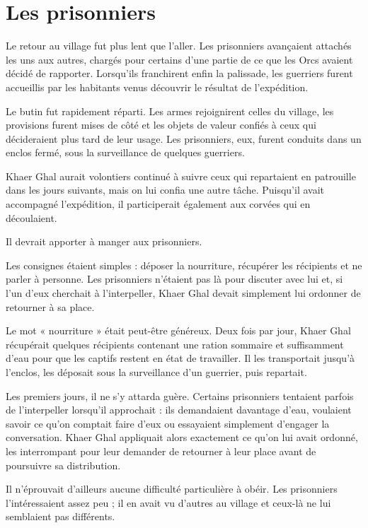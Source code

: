 \chapter{Les prisonniers}
\label{chap:les-prisonniers}

Le retour au village fut plus lent que l'aller. Les prisonniers avançaient
attachés les uns aux autres, chargés pour certains d'une partie de ce que les
Orcs avaient décidé de rapporter. Lorsqu'ils franchirent enfin la palissade,
les guerriers furent accueillis par les habitants venus découvrir le résultat
de l'expédition.

Le butin fut rapidement réparti. Les armes rejoignirent celles du village, les
provisions furent mises de côté et les objets de valeur confiés à ceux qui
décideraient plus tard de leur usage. Les prisonniers, eux, furent conduits
dans un enclos fermé, sous la surveillance de quelques guerriers.

Khaer Ghal aurait volontiers continué à suivre ceux qui repartaient en
patrouille dans les jours suivants, mais on lui confia une autre tâche.
Puisqu'il avait accompagné l'expédition, il participerait également aux corvées
qui en découlaient.

Il devrait apporter à manger aux prisonniers.

Les consignes étaient simples : déposer la nourriture, récupérer les récipients
et ne parler à personne. Les prisonniers n'étaient pas là pour discuter avec
lui et, si l'un d'eux cherchait à l'interpeller, Khaer Ghal devait simplement
lui ordonner de retourner à sa place.

Le mot « nourriture » était peut-être généreux. Deux fois par jour, Khaer Ghal
récupérait quelques récipients contenant une ration sommaire et suffisamment
d'eau pour que les captifs restent en état de travailler. Il les transportait
jusqu'à l'enclos, les déposait sous la surveillance d'un guerrier, puis
repartait.

Les premiers jours, il ne s'y attarda guère. Certains prisonniers tentaient
parfois de l'interpeller lorsqu'il approchait : ils demandaient davantage
d'eau, voulaient savoir ce qu'on comptait faire d'eux ou essayaient simplement
d'engager la conversation. Khaer Ghal appliquait alors exactement ce qu'on lui
avait ordonné, les interrompant pour leur demander de retourner à leur place
avant de poursuivre sa distribution.

Il n'éprouvait d'ailleurs aucune difficulté particulière à obéir. Les
prisonniers l'intéressaient assez peu ; il en avait vu d'autres au village et
ceux-là ne lui semblaient pas différents.

